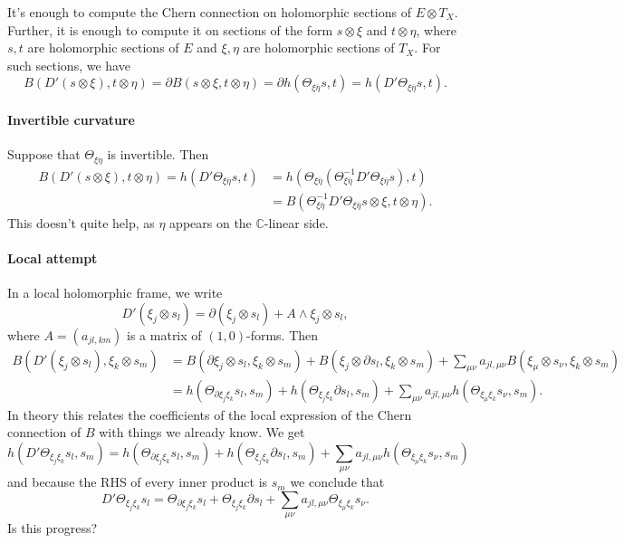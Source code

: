 \documentclass{article}
\begin{document}
It's enough to compute the Chern connection on holomorphic sections of $E \otimes T_X$. Further, it is enough to compute it on sections of the form $s \otimes \xi$ and $t \otimes \eta$, where $s, t$ are holomorphic sections of $E$ and $\xi, \eta$ are holomorphic sections of $T_X$. For such sections, we have
$$
B(D'(s \otimes \xi), t \otimes \eta)
= \partial B(s \otimes \xi, t \otimes \eta)
= \partial h(\Theta_{\xi \overline\eta} s, t)
= h(D'\Theta_{\xi \overline\eta} s, t).
$$

\paragraph{Invertible curvature}

Suppose that $\Theta_{\xi \eta}$ is invertible. Then
\begin{align*}
B(D'(s \otimes \xi), t \otimes \eta)
= h(D'\Theta_{\xi \overline\eta} s, t)
&= h(\Theta_{\xi \overline\eta}(\Theta_{\xi \overline\eta}^{-1}D'\Theta_{\xi \overline\eta} s), t)
\\
&= B(\Theta_{\xi \overline\eta}^{-1}D'\Theta_{\xi \overline\eta} s \otimes \xi, t \otimes \eta).
\end{align*}
This doesn't quite help, as $\eta$ appears on the $\mathbb{C}$-linear side.

\paragraph{Local attempt}

In a local holomorphic frame, we write
$$
D'(\xi_j \otimes s_l)
= \partial(\xi_j \otimes s_l) + A \wedge \xi_j \otimes s_l,
$$
where $A = (a_{jl,km})$ is a matrix of $(1,0)$-forms. Then
\begin{align*}
B(D'(\xi_j \otimes s_l), \xi_k \otimes s_m)
&= B(\partial \xi_j \otimes s_l, \xi_k \otimes s_m)
+ B(\xi_j \otimes \partial s_l, \xi_k \otimes s_m)
+ \sum_{\mu \nu} a_{jl,\mu \nu} B(\xi_\mu \otimes s_\nu, \xi_k \otimes s_m)
\\
&=
h(\Theta_{\partial \xi_j \xi_k} s_l, s_m)
+ h(\Theta_{\xi_j \xi_k} \partial s_l, s_m)
+ \sum_{\mu \nu} a_{jl,\mu \nu} h(\Theta_{\xi_\mu \xi_k} s_\nu, s_m).
\end{align*}
In theory this relates the coefficients of the local expression of the Chern connection of $B$ with things we already know. We get
$$
h(D'\Theta_{\xi_j \xi_k} s_l, s_m)
= h(\Theta_{\partial \xi_j \xi_k} s_l, s_m)
+ h(\Theta_{\xi_j \xi_k} \partial s_l, s_m)
+ \sum_{\mu \nu} a_{jl,\mu \nu} h(\Theta_{\xi_\mu \xi_k} s_\nu, s_m)
$$
and because the RHS of every inner product is $s_m$ we conclude that
$$
D'\Theta_{\xi_j \xi_k} s_l
= \Theta_{\partial \xi_j \xi_k} s_l
+ \Theta_{\xi_j \xi_k} \partial s_l
+ \sum_{\mu \nu} a_{jl,\mu \nu} \Theta_{\xi_\mu \xi_k} s_\nu.
$$
Is this progress?
\end{document}
